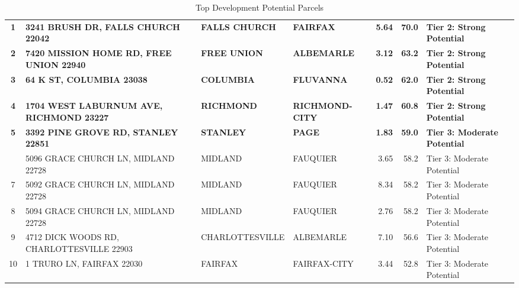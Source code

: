 \documentclass[
  letterpaper,
  DIV=11,
  numbers=noendperiod,
  oneside]{scrreprt}
\begin{document}
\begin{longtable}[t]{clllrrl}

\caption{\label{tbl-high-potential}Top Development Potential Parcels}

\tabularnewline

\toprule
\cellcolor[HTML]{445ca9}{\textcolor{white}{\textbf{Rank}}} & \cellcolor[HTML]{445ca9}{\textcolor{white}{\textbf{Address}}} & \cellcolor[HTML]{445ca9}{\textcolor{white}{\textbf{City}}} & \cellcolor[HTML]{445ca9}{\textcolor{white}{\textbf{County}}} & \cellcolor[HTML]{445ca9}{\textcolor{white}{\textbf{Acres}}} & \cellcolor[HTML]{445ca9}{\textcolor{white}{\textbf{Score}}} & \cellcolor[HTML]{445ca9}{\textcolor{white}{\textbf{Tier}}}\\
\midrule
\textbf{1} & \textbf{3241 BRUSH DR, FALLS CHURCH 22042} & \textbf{FALLS CHURCH} & \textbf{FAIRFAX} & \textbf{5.64} & \textbf{70.0} & \textbf{Tier 2: Strong Potential}\\
\textbf{2} & \textbf{7420 MISSION HOME RD, FREE UNION 22940} & \textbf{FREE UNION} & \textbf{ALBEMARLE} & \textbf{3.12} & \textbf{63.2} & \textbf{Tier 2: Strong Potential}\\
\textbf{3} & \textbf{64 K ST, COLUMBIA 23038} & \textbf{COLUMBIA} & \textbf{FLUVANNA} & \textbf{0.52} & \textbf{62.0} & \textbf{Tier 2: Strong Potential}\\
\textbf{4} & \textbf{1704 WEST LABURNUM AVE, RICHMOND 23227} & \textbf{RICHMOND} & \textbf{RICHMOND-CITY} & \textbf{1.47} & \textbf{60.8} & \textbf{Tier 2: Strong Potential}\\
\textbf{5} & \textbf{3392 PINE GROVE RD, STANLEY 22851} & \textbf{STANLEY} & \textbf{PAGE} & \textbf{1.83} & \textbf{59.0} & \textbf{Tier 3: Moderate Potential}\\
\addlinespace
6 & 5096 GRACE CHURCH LN, MIDLAND 22728 & MIDLAND & FAUQUIER & 3.65 & 58.2 & Tier 3: Moderate Potential\\
7 & 5092 GRACE CHURCH LN, MIDLAND 22728 & MIDLAND & FAUQUIER & 8.34 & 58.2 & Tier 3: Moderate Potential\\
8 & 5094 GRACE CHURCH LN, MIDLAND 22728 & MIDLAND & FAUQUIER & 2.76 & 58.2 & Tier 3: Moderate Potential\\
9 & 4712 DICK WOODS RD, CHARLOTTESVILLE 22903 & CHARLOTTESVILLE & ALBEMARLE & 7.10 & 56.6 & Tier 3: Moderate Potential\\
10 & 1 TRURO LN, FAIRFAX 22030 & FAIRFAX & FAIRFAX-CITY & 3.44 & 52.8 & Tier 3: Moderate Potential\\
\bottomrule

\end{longtable}
\end{document}
